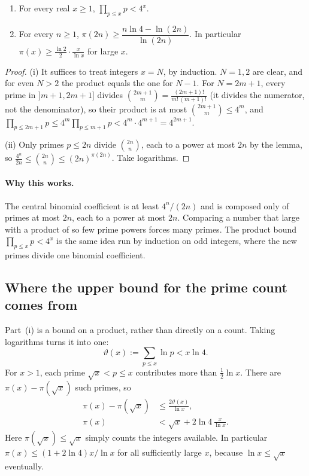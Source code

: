 \begin{theorem}\label{thm:cheb}
\begin{enumerate}[label=(\roman*)]
\item For every real $x\ge1$, $\displaystyle\prod_{p\le x}p<4^x$.
\item For every $n\ge1$, $\pi(2n)\ge\dfrac{n\ln4-\ln(2n)}{\ln(2n)}$. In particular $\pi(x)\ge\frac{\ln2}2\cdot\frac x{\ln x}$ for large $x$.
\end{enumerate}
\end{theorem}
\begin{proof}
(i) It suffices to treat integers $x=N$, by induction. $N=1,2$ are clear, and for even $N>2$ the product equals the one for $N-1$. For $N=2m+1$, every prime in $]m+1,2m+1]$ divides $\binom{2m+1}m=\frac{(2m+1)!}{m!\,(m+1)!}$ (it divides the numerator, not the denominator), so their product is at most $\binom{2m+1}m\le4^m$, and
$\prod_{p\le2m+1}p\le4^m\prod_{p\le m+1}p<4^m\cdot4^{m+1}=4^{2m+1}$.

(ii) Only primes $p\le2n$ divide $\binom{2n}n$, each to a power at most $2n$ by the lemma, so $\frac{4^n}{2n}\le\binom{2n}n\le(2n)^{\pi(2n)}$. Take logarithms.
\end{proof}

\paragraph{Why this works.}
The central binomial coefficient is at least $4^n/(2n)$ and is composed only of primes at most $2n$, each to a power at most $2n$. Comparing a number that large with a product of so few prime powers forces many primes. The product bound $\prod_{p\le x}p<4^x$ is the same idea run by induction on odd integers, where the new primes divide one binomial coefficient.

\subsection*{Where the upper bound for the prime count comes from}
Part~(i) is a bound on a product, rather than directly on a count. Taking logarithms turns it into one:
\[
\vartheta(x):=\sum_{p\le x}\ln p<x\ln4.
\]
For $x>1$, each prime $\sqrt x<p\le x$ contributes more than $\tfrac12\ln x$. There are $\pi(x)-\pi(\sqrt x)$ such primes, so
\[
\begin{aligned}
\pi(x)-\pi(\sqrt x)&\le\frac{2\vartheta(x)}{\ln x},\\
\pi(x)&<\sqrt x+2\ln4\,\frac x{\ln x}.
\end{aligned}
\]
Here $\pi(\sqrt x)\le\sqrt x$ simply counts the integers available. In particular $\pi(x)\le(1+2\ln4)x/\ln x$ for all sufficiently large $x$, because $\ln x\le\sqrt x$ eventually.

